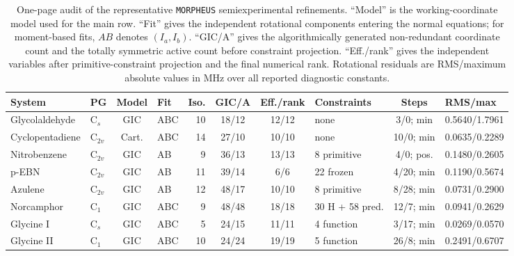 \begin{table}
\caption{One-page audit of the representative \texttt{MORPHEUS}
semiexperimental refinements. ``Model'' is the working-coordinate model used
for the main row. ``Fit'' gives the independent rotational components entering
the normal equations; for moment-based fits, $AB$ denotes $(I_a,I_b)$. ``GIC/A''
gives the algorithmically generated non-redundant coordinate count and the
totally symmetric active count before constraint projection. ``Eff./rank''
gives the independent variables after primitive-constraint projection and the
final numerical rank. Rotational residuals are RMS/maximum absolute values in
MHz over all reported diagnostic constants.}
\label{tab:benchmark-summary}
\scriptsize
\setlength{\tabcolsep}{2.0pt}
\begin{tabular}{@{}llclrcclcl@{}}
\toprule
System & PG & Model & Fit & Iso. & GIC/A & Eff./rank & Constraints & Steps & RMS/max \\
\midrule
Glycolaldehyde & C$_s$ & GIC & ABC & 10 & 18/12 & 12/12 & none & 3/0; min & 0.5640/1.7961 \\
Cyclopentadiene & C$_{2v}$ & Cart. & ABC & 14 & 27/10 & 10/10 & none & 10/0; min & 0.0635/0.2289 \\
Nitrobenzene & C$_{2v}$ & GIC & AB & 9 & 36/13 & 13/13 & 8 primitive & 4/0; pos. & 0.1480/0.2605 \\
p-EBN & C$_{2v}$ & GIC & AB & 11 & 39/14 & 6/6 & 22 frozen & 4/20; min & 0.1190/0.5674 \\
Azulene & C$_{2v}$ & GIC & AB & 12 & 48/17 & 10/10 & 8 primitive & 8/28; min & 0.0731/0.2900 \\
Norcamphor & C$_1$ & GIC & ABC & 9 & 48/48 & 18/18 & 30 H + 58 pred. & 12/7; min & 0.0941/0.2629 \\
Glycine I & C$_s$ & GIC & ABC & 5 & 24/15 & 11/11 & 4 function & 3/17; min & 0.0269/0.0570 \\
Glycine II & C$_1$ & GIC & ABC & 10 & 24/24 & 19/19 & 5 function & 26/8; min & 0.2491/0.6707 \\
\bottomrule
\end{tabular}
\end{table}
